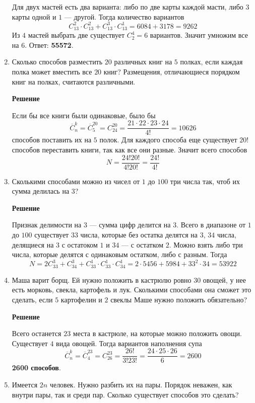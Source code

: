 \documentclass[12pt]{article}
\begin{document}
\begin{enumerate}[label={\textbf{\arabic{section}.\arabic*}}]
		Для двух мастей есть два варианта: либо по две карты каждой масти, либо $3$ карты одной и $1$ --- другой. Тогда количество вариантов
		$$
		C_{13}^{2}\cdot C_{13}^{2} + C_{13}^{3}\cdot C_{13}^{1} = 6084 + 3178 = 9262
		$$
		Из $4$ мастей выбрать две существует $C_2^4 = 6$ вариантов. Значит умножим все на $6$. Ответ: \textbf{55572}.
		
		\item Сколько способов разместить $20$ различных книг на $5$ полках, если каждая	полка может вместить все $20$ книг? Размещения, отличающиеся порядком книг на полках, считаются различными.
		
		\textbf{Решение}
		
		Если бы все книги были одинаковые, было бы
		$$
		\overline{C}_n^k = \overline{C}_{5}^{20} = C_{24}^{20} = \frac{21\cdot 22\cdot 23\cdot 24}{4!} = 10626
		$$
		способов поставить их на $5$ полок. Для каждого способа еще существует $20!$ способов переставить книги, так как все они разные. Значит всего способов
		$$
		N = \frac{24!20!}{4!20!} = \frac{24!}{4!}
		$$ 
		
		\item Сколькими способами можно из чисел от $1$ до $100$ три числа так, чтоб их сумма делилась на $3$?
		
		\textbf{Решение}
		
		Признак делимости на $3$ --- сумма цифр делится на $3$. Всего в диапазоне от $1$ до $100$ существует $33$ числа, которые без остатка делятся на $3$, $34$ числа, делящиеся на $3$ с остатоком $1$ и $34$ --- с остатком $2$. Можно взять либо три числа, которые делятся с одинаковым остатком, либо с разным. Тогда 
		$$
		N = 2C_{33}^3 + C_{34}^3 + C_{33}^1\cdot C_{33}^1\cdot C_{34}^1 = 2\cdot5456 + 5984 + 33^2\cdot 34 = 53922
		$$		
		
		\item Маша варит борщ. Ей нужно положить в кастрюлю ровно $30$ овощей, у нее есть морковь, свекла, картофель и лук. Сколькими способами она сможет это сделать, если $5$ картофелин и $2$ свеклы Маше нужно положить обязательно?

		
		\textbf{Решение}
		
		Всего останется $23$ места в кастрюле, на которые можно положить овощи. Существует $4$ вида овощей. Тогда вариантов наполнения супа
		$$
		\overline{C}_n^k = \overline{C}_{4}^{23} = C_{26}^{23} = \frac{26!}{3!23!} = \frac{24\cdot25\cdot26}{6} = 2600
		$$
		\textbf{2600 способов}.
		
		\item Имеется $2n$ человек. Нужно разбить их на пары. Порядок неважен, как внутри пары, так и среди пар. Сколько существует способов это сделать?
		

\end{enumerate}
\end{document}
